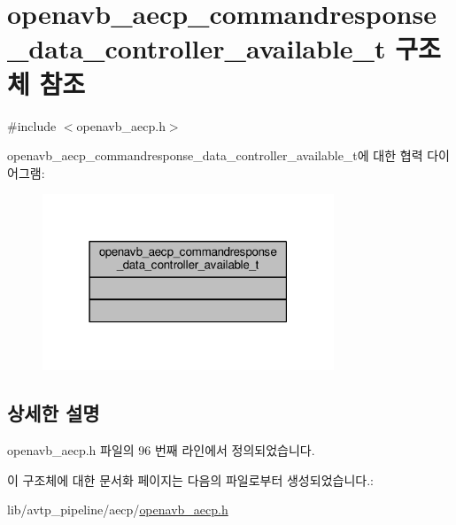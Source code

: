 \hypertarget{structopenavb__aecp__commandresponse__data__controller__available__t}{}\section{openavb\+\_\+aecp\+\_\+commandresponse\+\_\+data\+\_\+controller\+\_\+available\+\_\+t 구조체 참조}
\label{structopenavb__aecp__commandresponse__data__controller__available__t}


{\ttfamily \#include $<$openavb\+\_\+aecp.\+h$>$}



openavb\+\_\+aecp\+\_\+commandresponse\+\_\+data\+\_\+controller\+\_\+available\+\_\+t에 대한 협력 다이어그램\+:
\nopagebreak
\begin{figure}[H]
\begin{center}
\leavevmode
\includegraphics[width=247pt]{structopenavb__aecp__commandresponse__data__controller__available__t__coll__graph}
\end{center}
\end{figure}


\subsection{상세한 설명}


openavb\+\_\+aecp.\+h 파일의 96 번째 라인에서 정의되었습니다.



이 구조체에 대한 문서화 페이지는 다음의 파일로부터 생성되었습니다.\+:\begin{DoxyCompactItemize}
\item 
lib/avtp\+\_\+pipeline/aecp/\hyperlink{openavb__aecp_8h}{openavb\+\_\+aecp.\+h}\end{DoxyCompactItemize}
